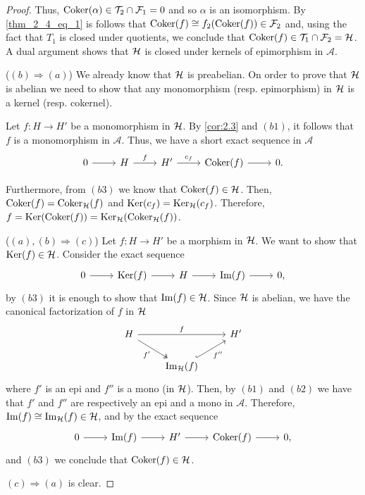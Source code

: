 \begin{proof}
  Thus, $\operatorname{Coker}(\alpha)\in\mathcal{T}_2\cap\mathcal{F}_1=0$ and so $\alpha$ is an isomorphism. By \eqref{thm_2_4_eq_1} is follows that $\operatorname{Coker}(f)\cong f_2(\operatorname{Coker}(f))\in\mathcal{F}_2$ and, using the fact that $T_1$ is closed under quotients, we conclude that $\operatorname{Coker}(f)\in\mathcal{T}_1\cap\mathcal{F}_2=\mathcal{H}$. A dual argument shows that $\mathcal{H}$ is closed under kernels of epimorphism in $\mathscr{A}$.

  ($(b)\Rightarrow (a)$) We already know that $\mathcal{H}$ is preabelian. On order to prove that $\mathcal{H}$ is abelian we need to show that any monomorphism (resp. epimorphism) in $\mathcal{H}$ is a kernel (resp. cokernel).

  Let $f:H\to H'$ be a monomorphism in $\mathcal{H}$. By \ref{cor:2.3} and $(b1)$, it follows that $f$ is a monomorphism in $\mathscr{A}$. Thus, we have a short exact sequence in $\mathscr{A}$
  \begin{equation*}
    \begin{tikzcd}
      0 \arrow{r}
      & H\arrow{r}{f}
        & H'\arrow{r}{c_f}
          & \Coker(f) \arrow{r}
            & 0.
    \end{tikzcd}
  \end{equation*}

  Furthermore, from $(b3)$ we know that $\operatorname{Coker}(f)\in\mathcal{H}$. Then, $\operatorname{Coker}(f)=\operatorname{Coker}_{\mathcal{H}}(f)$ and $\operatorname{Ker}(c_f)=\operatorname{Ker}_{\mathcal{H}}(c_f)$. Therefore, $f=\operatorname{Ker}(\operatorname{Coker}(f))=\operatorname{Ker}_{\mathcal{H}}(\operatorname{Coker}_{\mathcal{H}}(f))$.

  ($(a),(b)\Rightarrow (c)$) Let $f:H\to H'$ be a morphism in $\mathcal{H}$. We want to show that $\operatorname{Ker}(f)\in\mathcal{H}$. Consider the exact sequence
  \begin{equation*}
    \begin{tikzcd}
      0 \arrow{r}
      & \Ker(f)\arrow{r}
        & H\arrow{r}
          & \Img(f) \arrow{r}
            & 0,
    \end{tikzcd}
  \end{equation*}
  by $(b3)$ it is enough to show that $\operatorname{Im}(f)\in\mathcal{H}$. Since $\mathcal{H}$ is abelian, we have the canonical factorization of $f$ in $\mathcal{H}$
  \begin{equation*}
    \begin{tikzcd}
      H\arrow{rr}{f}\arrow[two heads]{rd}[']{f'}
      & & H'\\
      & \Img_\clH(f)\arrow[hook]{ur}[']{f''}
        &
    \end{tikzcd}
  \end{equation*}
  where $f'$ is an epi and $f''$ is a mono (in $\mathcal{H}$). Then, by $(b1)$ and $(b2)$ we have that $f'$ and $f''$ are respectively an epi and a mono in $\mathscr{A}$. Therefore, $\operatorname{Im}(f)\cong \operatorname{Im}_{\mathcal{H}}(f)\in\mathcal{H}$, and by the exact sequence
  \begin{equation*}
    \begin{tikzcd}
      0 \arrow{r}
      & \Img(f)\arrow{r}
        & H'\arrow{r}
          & \Coker(f) \arrow{r}
            & 0,
    \end{tikzcd}
  \end{equation*}
  and $(b3)$ we conclude that $\operatorname{Coker}(f)\in\mathcal{H}$.

  $(c)\Rightarrow (a)$ is clear.

\end{proof}

